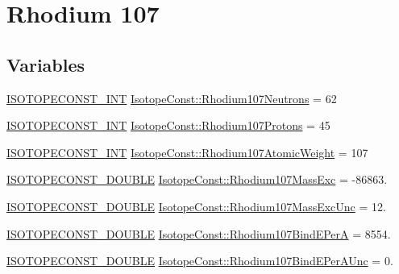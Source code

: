 \hypertarget{group___isotope_const-_rhodium-_rh107}{}\section{Rhodium 107}
\label{group___isotope_const-_rhodium-_rh107}
\subsection*{Variables}
\begin{DoxyCompactItemize}
\item 
\mbox{\hyperlink{group___isotope_const-_macros_ga5f18360b3e99483a35c32d789e62621c}{I\+S\+O\+T\+O\+P\+E\+C\+O\+N\+S\+T\+\_\+\+I\+NT}} \mbox{\hyperlink{group___isotope_const-_rhodium-_rh107_gacd4a0722d3f40c8b0d69b9a10f0025ef}{Isotope\+Const\+::\+Rhodium107\+Neutrons}} = 62
\item 
\mbox{\hyperlink{group___isotope_const-_macros_ga5f18360b3e99483a35c32d789e62621c}{I\+S\+O\+T\+O\+P\+E\+C\+O\+N\+S\+T\+\_\+\+I\+NT}} \mbox{\hyperlink{group___isotope_const-_rhodium-_rh107_gaa67159176cc77536dd72de75929ae1cd}{Isotope\+Const\+::\+Rhodium107\+Protons}} = 45
\item 
\mbox{\hyperlink{group___isotope_const-_macros_ga5f18360b3e99483a35c32d789e62621c}{I\+S\+O\+T\+O\+P\+E\+C\+O\+N\+S\+T\+\_\+\+I\+NT}} \mbox{\hyperlink{group___isotope_const-_rhodium-_rh107_ga9ba42f0745c0462ab0721287812b0b91}{Isotope\+Const\+::\+Rhodium107\+Atomic\+Weight}} = 107
\item 
\mbox{\hyperlink{group___isotope_const-_macros_ga8f45a7272ce02c0b4c65c44636ed719a}{I\+S\+O\+T\+O\+P\+E\+C\+O\+N\+S\+T\+\_\+\+D\+O\+U\+B\+LE}} \mbox{\hyperlink{group___isotope_const-_rhodium-_rh107_ga424996de968fcf56df02de0b78dde620}{Isotope\+Const\+::\+Rhodium107\+Mass\+Exc}} = -\/86863.
\item 
\mbox{\hyperlink{group___isotope_const-_macros_ga8f45a7272ce02c0b4c65c44636ed719a}{I\+S\+O\+T\+O\+P\+E\+C\+O\+N\+S\+T\+\_\+\+D\+O\+U\+B\+LE}} \mbox{\hyperlink{group___isotope_const-_rhodium-_rh107_ga38846c513362170bde2e39a6ae2036f5}{Isotope\+Const\+::\+Rhodium107\+Mass\+Exc\+Unc}} = 12.
\item 
\mbox{\hyperlink{group___isotope_const-_macros_ga8f45a7272ce02c0b4c65c44636ed719a}{I\+S\+O\+T\+O\+P\+E\+C\+O\+N\+S\+T\+\_\+\+D\+O\+U\+B\+LE}} \mbox{\hyperlink{group___isotope_const-_rhodium-_rh107_ga34a687c5969e555a92392d10f618b44f}{Isotope\+Const\+::\+Rhodium107\+Bind\+E\+PerA}} = 8554.
\item 
\mbox{\hyperlink{group___isotope_const-_macros_ga8f45a7272ce02c0b4c65c44636ed719a}{I\+S\+O\+T\+O\+P\+E\+C\+O\+N\+S\+T\+\_\+\+D\+O\+U\+B\+LE}} \mbox{\hyperlink{group___isotope_const-_rhodium-_rh107_gaf10d45d7a4e7c0b54d741e332db766c6}{Isotope\+Const\+::\+Rhodium107\+Bind\+E\+Per\+A\+Unc}} = 0.

\end{DoxyCompactItemize}
